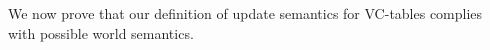 \begin{exam}
\end{exam}

We now prove that our definition of  update semantics for VC-tables complies with possible world semantics. %

